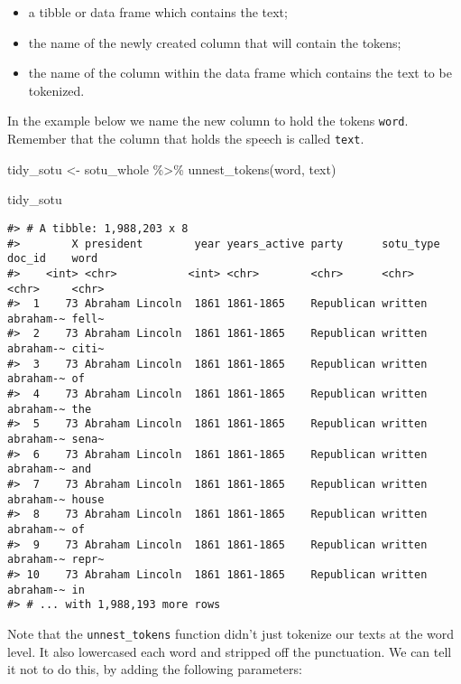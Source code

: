 \documentclass[
]{book}
\newenvironment{Shaded}{\begin{snugshade}}{\end{snugshade}}
\newcommand{\FunctionTok}[1]{\textcolor[rgb]{0.00,0.00,0.00}{#1}}
\newcommand{\NormalTok}[1]{#1}
\newcommand{\OtherTok}[1]{\textcolor[rgb]{0.56,0.35,0.01}{#1}}
\newcommand{\SpecialCharTok}[1]{\textcolor[rgb]{0.00,0.00,0.00}{#1}}
\providecommand{\tightlist}{%
  \setlength{\itemsep}{0pt}\setlength{\parskip}{0pt}}
\begin{document}
\begin{itemize}
\tightlist
\item
  a tibble or data frame which contains the text;
\item
  the name of the newly created column that will contain the tokens;
\item
  the name of the column within the data frame which contains the text to be tokenized.
\end{itemize}

In the example below we name the new column to hold the tokens \texttt{word}. Remember that the column that holds the speech is called \texttt{text}.

\begin{Shaded}
\begin{Highlighting}[]
\NormalTok{tidy\_sotu }\OtherTok{\textless{}{-}}\NormalTok{ sotu\_whole }\SpecialCharTok{\%\textgreater{}\%}
  \FunctionTok{unnest\_tokens}\NormalTok{(word, text)}

\NormalTok{tidy\_sotu}
\end{Highlighting}
\end{Shaded}

\begin{verbatim}
#> # A tibble: 1,988,203 x 8
#>        X president        year years_active party      sotu_type doc_id    word 
#>    <int> <chr>           <int> <chr>        <chr>      <chr>     <chr>     <chr>
#>  1    73 Abraham Lincoln  1861 1861-1865    Republican written   abraham-~ fell~
#>  2    73 Abraham Lincoln  1861 1861-1865    Republican written   abraham-~ citi~
#>  3    73 Abraham Lincoln  1861 1861-1865    Republican written   abraham-~ of   
#>  4    73 Abraham Lincoln  1861 1861-1865    Republican written   abraham-~ the  
#>  5    73 Abraham Lincoln  1861 1861-1865    Republican written   abraham-~ sena~
#>  6    73 Abraham Lincoln  1861 1861-1865    Republican written   abraham-~ and  
#>  7    73 Abraham Lincoln  1861 1861-1865    Republican written   abraham-~ house
#>  8    73 Abraham Lincoln  1861 1861-1865    Republican written   abraham-~ of   
#>  9    73 Abraham Lincoln  1861 1861-1865    Republican written   abraham-~ repr~
#> 10    73 Abraham Lincoln  1861 1861-1865    Republican written   abraham-~ in   
#> # ... with 1,988,193 more rows
\end{verbatim}

Note that the \texttt{unnest\_tokens} function didn't just tokenize our texts at the word level. It also lowercased each word and stripped off the punctuation. We can tell it not to do this, by adding the following parameters:
\end{document}
